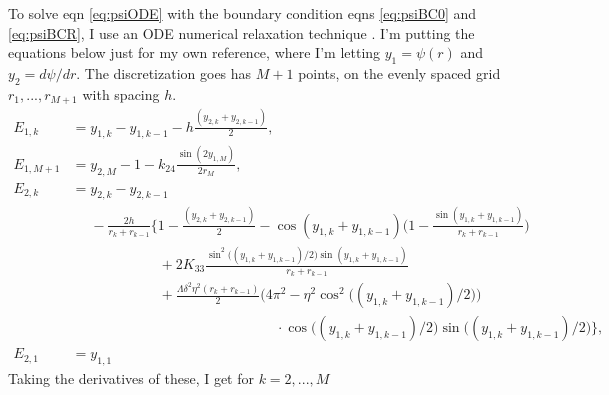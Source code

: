 \documentclass[12pt]{article}
\begin{document}
To solve eqn \ref{eq:psiODE} with the boundary condition eqns \ref{eq:psiBC0} and \ref{eq:psiBCR}, I use an ODE numerical relaxation technique \cite{numrec}. I'm putting the equations below just for my own reference, where I'm letting $y_1=\psi(r)$ and $y_2=d\psi/dr$. The discretization goes has $M+1$ points, on the evenly spaced grid $r_1,...,r_{M+1}$ with spacing $h$.
\begin{subequations}
\begin{align}
E_{1,k}&=y_{1,k}-y_{1,k-1}-h\frac{(y_{2,k}+y_{2,k-1})}{2},\\
E_{1,M+1}&=y_{2,M}-1-k_{24}\frac{\sin(2y_{1,M})}{2r_M},\\
E_{2,k}&=y_{2,k}-y_{2,k-1}\nonumber\\
&\phantom{=}-\frac{2h}{r_k+r_{k-1}}\bigg\{1-\frac{(y_{2,k}+y_{2,k-1})}{2}-\cos(y_{1,k}+y_{1,k-1})\bigg(1-\frac{\sin(y_{1,k}+y_{1,k-1})}{r_k+r_{k-1}}\bigg)\nonumber\\
&\phantom{=-\frac{2h}{r_k+r_{k-1}}\bigg\{\}}+2K_{33}\frac{\sin^2\big((y_{1,k}+y_{1,k-1})/2\big)\sin(y_{1,k}+y_{1,k-1})}{r_k+r_{k-1}}\nonumber\\
&\phantom{=-\frac{2h}{r_k+r_{k-1}}\bigg\{\}}+\frac{\Lambda\delta^2\eta^2(r_k+r_{k-1})}{2}\big(4\pi^2-\eta^2\cos^2\big((y_{1,k}+y_{1,k-1})/2\big)\big)\nonumber\\
&\phantom{=-\frac{2h}{r_k+r_{k-1}}\bigg\{\}\Lambda\delta^2\eta^2(r_k+r_{k-1})}\cdot\cos\big((y_{1,k}+y_{1,k-1})/2\big)\sin\big((y_{1,k}+y_{1,k-1})/2\big)\bigg\},\\
E_{2,1}&=y_{1,1}
\end{align}
\end{subequations}
Taking the derivatives of these, I get for $k=2,...,M$
\end{document}
